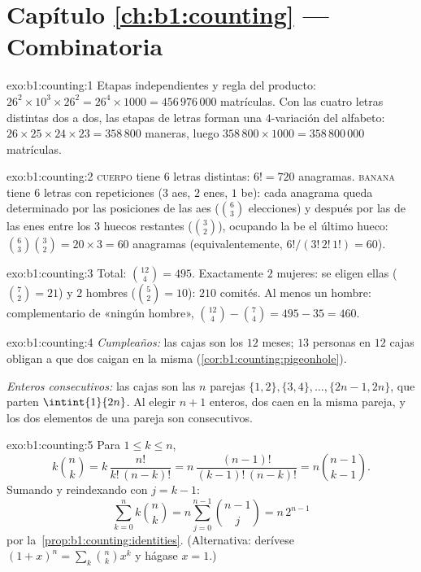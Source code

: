 \section*{Capítulo \ref{ch:b1:counting} --- Combinatoria}

\begin{solution}{exo:b1:counting:1}
Etapas independientes y regla del producto: $26^2 \times 10^3 \times 26^2
= 26^4 \times 1000 = 456\,976\,000$ matrículas. Con las cuatro letras
distintas dos a dos, las etapas de letras forman una $4$-variación del
alfabeto: $26 \times 25 \times 24 \times 23 = 358\,800$ maneras, luego
$358\,800 \times 1000 = 358\,800\,000$ matrículas.
\end{solution}

\begin{solution}{exo:b1:counting:2}
\textsc{cuerpo} tiene $6$ letras distintas: $6! = 720$ anagramas.
\textsc{banana} tiene $6$ letras con repeticiones ($3$ aes, $2$ enes,
$1$ be): cada anagrama queda determinado por las posiciones de las aes
($\binom 63$ elecciones) y después por las de las enes entre los $3$
huecos restantes ($\binom 32$), ocupando la be el último hueco:
$\binom{6}{3}\binom{3}{2} = 20 \times 3 = 60$ anagramas
(equivalentemente, $6!/(3!\,2!\,1!) = 60$).
\end{solution}

\begin{solution}{exo:b1:counting:3}
Total: $\binom{12}{4} = 495$. Exactamente $2$ mujeres: se eligen ellas
($\binom 72 = 21$) y $2$ hombres ($\binom 52 = 10$): $210$ comités. Al
menos un hombre: complementario de «ningún hombre»,
$\binom{12}{4} - \binom{7}{4} = 495 - 35 = 460$.
\end{solution}

\begin{solution}{exo:b1:counting:4}
\emph{Cumpleaños:} las cajas son los $12$ meses; $13$ personas en $12$
cajas obligan a que dos caigan en la misma
(\cref{cor:b1:counting:pigeonhole}).

\emph{Enteros consecutivos:} las cajas son las $n$ parejas $\{1,2\},
\{3,4\}, \dots, \{2n-1, 2n\}$, que parten $\intint{1}{2n}$. Al elegir
$n + 1$ enteros, dos caen en la misma pareja, y los dos elementos de una
pareja son consecutivos.
\end{solution}

\begin{solution}{exo:b1:counting:5}
Para $1 \leq k \leq n$,
\[
k \binom nk = k\,\frac{n!}{k!\,(n-k)!}
= n\,\frac{(n-1)!}{(k-1)!\,(n-k)!} = n \binom{n-1}{k-1}.
\]
Sumando y reindexando con $j = k - 1$:
\[
\sum_{k=0}^{n} k \binom nk = n \sum_{j=0}^{n-1} \binom{n-1}{j}
= n\, 2^{n-1}
\]
por la~\cref{prop:b1:counting:identities}. (Alternativa: derívese
$(1+x)^n = \sum_k \binom nk x^k$ y hágase $x = 1$.)
\end{solution}

